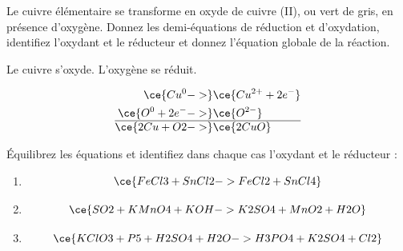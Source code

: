 \documentclass[
  11pt,
  a4paper,
  openany]{book}
\providecommand{\tightlist}{%
  \setlength{\itemsep}{0pt}\setlength{\parskip}{0pt}}
\begin{document}
\clearpage

\begin{Exercise}
Le cuivre élémentaire se transforme en oxyde de cuivre (II), ou vert de gris, en présence d'oxygène. Donnez les demi-équations de réduction et d'oxydation, identifiez l'oxydant et le réducteur et donnez l'équation globale de la réaction.

\end{Exercise}

\begin{Answer}
Le cuivre s'oxyde. L'oxygène se réduit.

\[
\begin{split}
\ce{Cu^{0} ->} & \ce{Cu^{2+} + 2 e^-} \\
\ce{O^{0} + 2 e^- ->} & \ce{O^{2-}} \\
\hline
\ce{2 Cu + O2 ->} & \ce{2 CuO}
\end{split}
\]

\end{Answer}

\begin{Exercise}

Équilibrez les équations et identifiez dans chaque cas l'oxydant et le réducteur :

\begin{enumerate}
\def\labelenumi{\alph{enumi}.}
\tightlist
\item
  \[
  \ce{FeCl3 + SnCl2 -> FeCl2 + SnCl4}
  \]
\item
  \[
  \ce{SO2 + KMnO4 + KOH -> K2SO4 + MnO2 + H2O}
  \]
\item
  \[
  \ce{KClO3 + P5 + H2SO4 + H2O -> H3PO4 + K2SO4 + Cl2}
  \]
\end{enumerate}

\end{Exercise}
\end{document}

